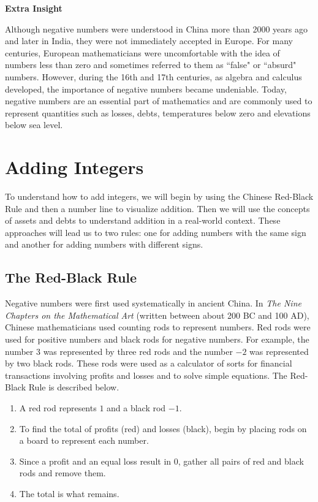 \documentclass{ximera}[font=12pt]
\begin{document}
\begin{Huge}
\textbf{Extra Insight}
\end{Huge}

\normalsize
Although negative numbers were understood in China more than 2000 years ago and later in India, they were not immediately accepted in Europe.
For many centuries, European mathematicians were uncomfortable with the idea of numbers less than zero and sometimes referred to them  as ``false" or
``absurd" numbers.  However, during the 16th and 17th centuries, as algebra and calculus developed, the importance of negative numbers became undeniable.
Today, negative numbers are an essential part of mathematics and are commonly used to represent quantities such as losses, debts, temperatures below zero and
elevations below sea level.

\section*{Adding Integers}

To understand how to add integers, we will begin by using the Chinese Red-Black Rule and then a number line to visualize addition.  Then we will use the concepts of assets and debts to understand addition in a real-world context.  These approaches will lead us to two rules: one for adding numbers with the same sign and another for adding numbers with different signs.

\subsection*{The Red-Black Rule}

Negative numbers were first used systematically in ancient China. In \emph{The Nine Chapters on the Mathematical Art} (written between about 200 BC and 100 AD), Chinese mathematicians used counting rods to represent numbers.  Red rods were used for positive numbers and black rods for negative numbers.  For example, the number 3 was
represented by three red rods and the number $-2$ was represented by two black rods.  These rods were used as a calculator of sorts for financial transactions involving profits and losses and to solve simple equations.  The Red-Black Rule is described below.

\begin{enumerate}[itemsep=2ex]
\item A red rod represents $1$ and a black rod $-1.$

\item To find the total of profits (red) and losses (black), begin by placing rods on a board to represent each number.

\item Since a profit and an equal loss result in 0, gather all pairs of red and black rods and remove them.

\item The total is what remains.
\end{enumerate}
\end{document}

